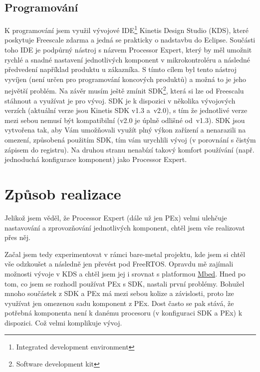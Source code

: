 \documentclass[a4paper]{article}
\begin{document}
\subsection{Programování}
K programování jsem využil vývojové IDE\footnote{Integrated development environment} Kinetis Design Studio (KDS), které poskytuje Freescale zdarma a jedná se prakticky o nadstavbu do Eclipse. Součásti toho IDE je podpůrný nástroj s názvem Processor Expert, který by měl umožnit rychlé a snadné nastavení jednotlivých komponent v mikrokontroléru a následné předvedení například produktu u zákazníka. S tímto cílem byl tento nástroj vyvíjen (není určen pro programování koncových produktů) a možná to je jeho největší problém. Na závěr musím ještě zmínit SDK\footnote{Software development kit}, která si lze od Freescalu stáhnout a využívat je pro vývoj. SDK je k dispozici v několika vývojových verzích (aktuální verze jsou Kinetis SDK v1.3 a~v2.0), s tím že jednotlivé verze mezi sebou nemusí být kompatibilní (v2.0 je úplně odlišné od~v1.3). SDK jsou vytvořena tak, aby Vám umožňovali využít plný výkon zařízení a nenarazili na omezení, způsobená použitím SDK, tím vám urychlili vývoj (v porovnání s čistým zápisem do registru). Na druhou stranu nenabízí takový komfort používání (např. jednoduchá konfigurace komponent) jako Processor Expert.
   
\section{Způsob realizace}

Jelikož jsem věděl, že Processor Expert (dále už jen PEx) velmi ulehčuje nastavování a zprovozňování jednotlivých komponent, chtěl jsem vše realizovat přes něj.

Začal jsem tedy experimentovat v rámci bare-metal projektu, kde jsem si chtěl vše odzkoušet a následně jen převést pod FreeRTOS. Opravdu mě zajímali možnosti vývoje v KDS a chtěl jsem jej i srovnat s platformou \href{www.mbed.org}{Mbed}. Hned po tom, co jsem se rozhodl používat PEx s SDK, nastali první problémy. Bohužel mnoho součástek z SDK a PEx má mezi sebou kolize a závislosti, proto lze využívat jen omezenou sadu komponent z PEx. Dost často se pak stává, že potřebná komponenta není k danému procesoru (v konfiguraci SDK a PEx) k dispozici. Což velmi komplikuje vývoj. 
\end{document}
